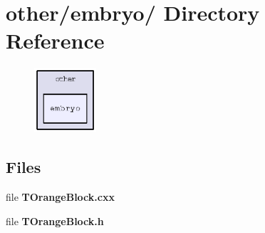 \section{other/embryo/ Directory Reference}
\label{dir_5af136c2ec5457ed075b9a5bfaca082d}


\begin{figure}[H]
\begin{center}
\leavevmode
\includegraphics[width=65pt]{dir_5af136c2ec5457ed075b9a5bfaca082d_dep}
\end{center}
\end{figure}
\subsection*{Files}
\begin{CompactItemize}
\item 
file \textbf{TOrange\-Block.cxx}
\item 
file \textbf{TOrange\-Block.h}
\end{CompactItemize}
